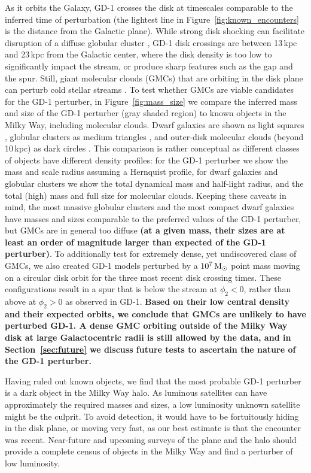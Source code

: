 \documentclass[twocolumn]{aastex62}
\newcommand{\changes}[1]{{\textbf{#1}}}
\begin{document}
As it orbits the Galaxy, GD-1 crosses the disk at timescales comparable to the inferred time of perturbation (the lightest line in Figure~\ref{fig:known_encounters} is the distance from the Galactic plane).
While strong disk shocking can facilitate disruption of a diffuse globular cluster \citep{dehnen2004}, GD-1 disk crossings are between 13\,kpc and 23\,kpc from the Galactic center, where the disk density is too low to significantly impact the stream, or produce sharp features such as the gap and the spur.
Still, giant molecular clouds (GMCs) that are orbiting in the disk plane can perturb cold stellar streams \citep{amorisco2016}.
To test whether GMCs are viable candidates for the GD-1 perturber, in Figure~\ref{fig:mass_size} we compare the inferred mass and size of the GD-1 perturber (gray shaded region) to known objects in the Milky Way, including molecular clouds.
Dwarf galaxies are shown as light squares \citep{mcconnachie2012}, globular clusters as medium triangles \citep{baumgardt2018}, and outer-disk molecular clouds (beyond 10\,kpc) as dark circles \citep{md2017}.
This comparison is rather conceptual as different classes of objects have different density profiles: for the GD-1 perturber we show the mass and scale radius assuming a Hernquist profile, for dwarf galaxies and globular clusters we show the total dynamical mass and half-light radius, and the total (high) mass and full size for molecular clouds.
Keeping these caveats in mind, the most massive globular clusters and the most compact dwarf galaxies have masses and sizes comparable to the preferred values of the GD-1 perturber, but GMCs are in general too diffuse \changes{(at a given mass, their sizes are at least an order of magnitude larger than expected of the GD-1 perturber)}.
To additionally test for extremely dense, yet undiscovered class of GMCs, we also created GD-1 models perturbed by a $10^7\,\rm M_\odot$ point mass moving on a circular disk orbit for the three most recent disk crossing times.
These configurations result in a spur that is below the stream at $\phi_2<0$, rather than above at $\phi_2>0$ as observed in GD-1.
\changes{Based on their low central density and their expected orbits, we conclude that GMCs are unlikely to have perturbed GD-1.
A dense GMC orbiting outside of the Milky Way disk at large Galactocentric radii is still allowed by the data, and in Section~\ref{sec:future} we discuss future tests to ascertain the nature of the GD-1 perturber.
}

Having ruled out known objects, we find that the most probable GD-1 perturber is a dark object in the Milky Way halo.
As luminous satellites can have approximately the required masses and sizes, a low luminosity unknown satellite might be the culprit.
To avoid detection, it would have to be fortuitously hiding in the disk plane, or moving very fast, as our best estimate is that the encounter was recent.
Near-future and upcoming surveys of the plane \citep{schlafly2018} and the halo \citep{lsst} should provide a complete census of objects in the Milky Way and find a perturber of low luminosity.
\end{document}
